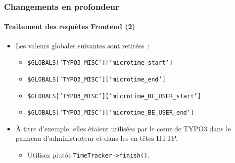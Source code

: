 \begin{frame}[fragile]
	\frametitle{Changements en profondeur}
	\framesubtitle{Traitement des requêtes Frontend (2)}

	\lstset{basicstyle=\smaller\ttfamily}

	\begin{itemize}
		\item Les valeurs globales suivantes sont retirées~:

			\begin{itemize}
				\item \texttt{\$GLOBALS['TYPO3\_MISC']['microtime\_start']}
				\item \texttt{\$GLOBALS['TYPO3\_MISC']['microtime\_end']}
				\item \texttt{\$GLOBALS['TYPO3\_MISC']['microtime\_BE\_USER\_start']}
				\item \texttt{\$GLOBALS['TYPO3\_MISC']['microtime\_BE\_USER\_end']}
			\end{itemize}

		\item À titre d'exemple, elles étaient utilisées par le cœur de TYPO3 dans le panneau d'administrateur
			et dans les en-têtes HTTP\@.

			\begin{itemize}\smaller
				\item[\ding{228}] Utilisez plutôt \texttt{TimeTracker->finish()}.
			\end{itemize}\normalsize

	\end{itemize}

\end{frame}



